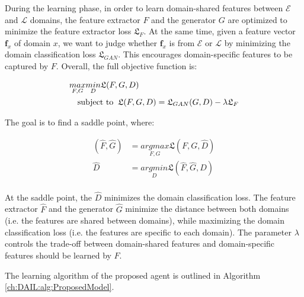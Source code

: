 During the learning phase,
in order to learn domain-shared features between $\mathcal{E}$ and $\mathcal{L}$ domains,
the feature extractor $F$ and the generator $G$ are optimized to minimize the feature extractor loss $\mathfrak{L}_F$.
At the same time,
given a feature vector $\mathbf{f}_x$ of domain $x$,
we want to judge whether $\mathbf{f}_x$ is from $\mathcal{E}$ or $\mathcal{L}$ by minimizing the domain classification loss $\mathfrak{L}_{GAN}$.
This encourages domain-specific features to be captured by $F$.
Overall, the full objective function is:

\begin{align}
   & \underset{F, G}{max} \underset{D}{min} \mathfrak{L}(F, G, D) \\
   & \quad\text{subject to \:}
  \mathfrak{L}(F, G, D) = {\mathfrak{L}_{GAN}(G, D)} - \lambda\mathfrak{L}_F
\end{align}

The goal is to find a saddle point, where:

\begin{align}
  (\hat{F}, \hat{G}) & = \underset{F, G}{argmax}{\mathfrak{L}(F, G, \hat{D})}    \\
  \hat{D}            & = \underset{D}{argmin}{\mathfrak{L}(\hat{F}, \hat{G}, D)} \\
\end{align}

At the saddle point,
the $\hat{D}$ minimizes the domain classification loss.
The feature extractor $\hat{F}$ and the generator $\hat{G}$ minimize the distance between both domains (i.e. the features are shared between domains),
while maximizing the domain classification loss (i.e. the features are specific to each domain).
The parameter $\lambda$ controls the trade-off between domain-shared features and domain-specific features should be learned by $F$.

The learning algorithm of the proposed agent is outlined in Algorithm \ref{ch:DAIL:alg:ProposedModel}.



